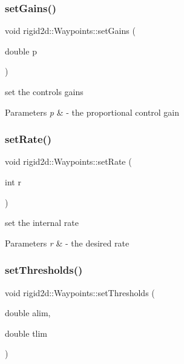 \subsubsection{\texorpdfstring{set\+Gains()}{setGains()}}
{\footnotesize\ttfamily void rigid2d\+::\+Waypoints\+::set\+Gains (\begin{DoxyParamCaption}\item[{double}]{p }\end{DoxyParamCaption})}



set the controls gains 


\begin{DoxyParams}{Parameters}
{\em p} & -\/ the proportional control gain \\
\hline
\end{DoxyParams}
\mbox{\label{classrigid2d_1_1Waypoints_a00beb3a1c2d2f3b24e2a107221a8fa9c}} 
\subsubsection{\texorpdfstring{set\+Rate()}{setRate()}}
{\footnotesize\ttfamily void rigid2d\+::\+Waypoints\+::set\+Rate (\begin{DoxyParamCaption}\item[{int}]{r }\end{DoxyParamCaption})}



set the internal rate 


\begin{DoxyParams}{Parameters}
{\em r} & -\/ the desired rate \\
\hline
\end{DoxyParams}
\mbox{\label{classrigid2d_1_1Waypoints_a056d60e2226093ab70f218f6088e0bd9}} 
\subsubsection{\texorpdfstring{set\+Thresholds()}{setThresholds()}}
{\footnotesize\ttfamily void rigid2d\+::\+Waypoints\+::set\+Thresholds (\begin{DoxyParamCaption}\item[{double}]{alim,  }\item[{double}]{tlim }\end{DoxyParamCaption})}



